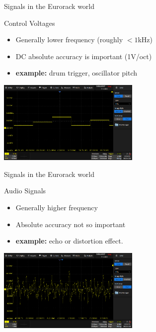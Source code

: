 \documentclass[aspectratio=169]{beamer}
\begin{document}
\begin{frame}{Signals in the Eurorack world}

    \begin{block}{Control Voltages}
        \begin{itemize}
            \item Generally lower frequency (roughly $<1$kHz)
            \item DC absolute accuracy is important (1V/oct)
            \item \textbf{example:} drum trigger, oscillator pitch
        \end{itemize}
    \end{block}


    \begin{center}
        \includegraphics[height=4cm]{img/scope_cv.png}
    \end{center}

\end{frame}

\begin{frame}{Signals in the Eurorack world}

    \begin{block}{Audio Signals}
        \begin{itemize}
            \item Generally higher frequency
            \item Absolute accuracy not so important
            \item \textbf{example:} echo or distortion effect.
        \end{itemize}
    \end{block}


    \begin{center}
        \includegraphics[height=4cm]{img/scope_audio.png}
    \end{center}

\end{frame}
\end{document}
